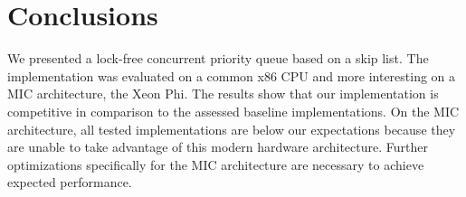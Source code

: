 \section{Conclusions}
\label{sec:con}
We presented a lock-free concurrent priority queue based on a skip list. The implementation was evaluated on a common x86 CPU and more interesting on a MIC architecture, the Xeon Phi. The results show that our implementation is competitive in comparison to the assessed baseline implementations. On the MIC architecture, all tested implementations are below our expectations because they are unable to take advantage of this modern hardware architecture. Further optimizations specifically for the MIC architecture are necessary to achieve expected performance.
